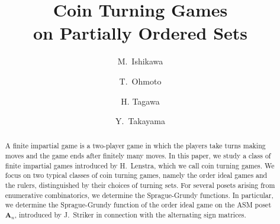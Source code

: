 \documentclass[a4paper,11pt]{amsart}
\theoremstyle{definition}
\numberwithin{equation}{section}
\def\ASM#1{\boldsymbol{A}_{#1}}
\begin{document}
%
\title[Coin Turning Games on Partially Ordered Sets]
{
	Coin Turning Games \\on Partially Ordered Sets
}
\author{M.~Ishikawa}
\address{Masao Ishikawa, Department of Mathematics, Okayama University}
\author{T.~Ohmoto}
\address{Toyokazu Ohmoto, Department of Mathematics, Okayama University}
\author{H. Tagawa}
\address{Hiroyuki Tagawa, Department of Mathematics, Wakayama University}
\author{Y.~Takayama}
\address{Yoshiki Takayama, Department of Mathematics, Okayama University}
%
%
%
%
\maketitle
%
\begin{abstract}
A finite impartial game is a two-player game 
in which the players take turns making moves and the game ends after finitely many moves.
In this paper, we study a class of finite impartial games introduced by H.~Lenstra, 
which we call coin turning games.
We focus on two typical classes of coin turning games, 
namely the order ideal games and the rulers, 
distinguished by their choices of turning sets.
For several posets arising from enumerative combinatorics, 
we determine the Sprague-Grundy functions.
In particular, we determine the Sprague-Grundy function of the order ideal game on the ASM poset $\ASM{n}$, 
introduced by J.~Striker in connection with the alternating sign matrices.
\end{abstract}
%
%
%
\tableofcontents
%
%
%
%
%
\end{document}
